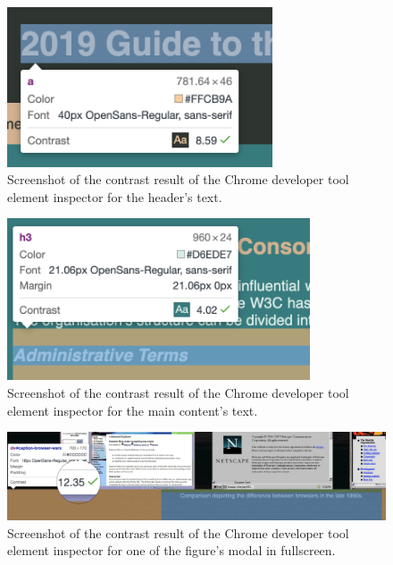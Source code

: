 \documentclass[letterpaper,12pt]{article}
\begin{document}
\begin{appendices}
\begin{figure}[h] 
\centerline{\includegraphics[width=0.7\textwidth]{report/images/accessibility-contrast-header.png}}
\caption{\label{fig:accessibility-contrast-header}Screenshot of the contrast result of the Chrome developer tool element inspector for the header's text.}
\end{figure}

\begin{figure}[h] 
\centerline{\includegraphics[width=0.8\textwidth]{report/images/accessibility-contrast-text.png}}
\caption{\label{fig:accessibility-contrast-text}Screenshot of the contrast result of the Chrome developer tool element inspector for the main content's text.}
\end{figure}

\begin{figure}[ht] 
\centerline{\includegraphics[width=\textwidth]{report/images/accessibility-contrast-modal.png}}
\caption{\label{fig:accessibility-contrast-modal}Screenshot of the contrast result of the Chrome developer tool element inspector for one of the figure's modal in fullscreen.}
\end{figure}


\end{appendices}
\end{document}
